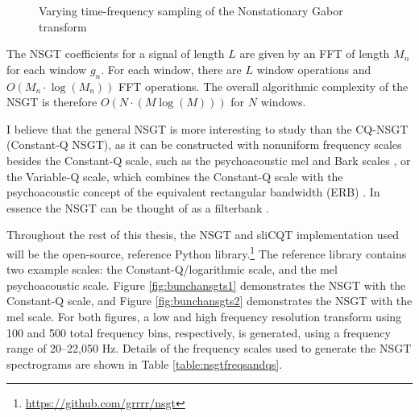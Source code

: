 \documentclass[report.tex]{subfiles}
\begin{document}
\begin{figure}[ht]
	\centering
	\hspace{1em}
	\caption{Varying time-frequency sampling of the Nonstationary Gabor transform \parencite[1485, 1487]{balazs}}
	\label{fig:nonuniformtflattices}
\end{figure}

The NSGT coefficients for a signal of length $L$ are given by an FFT of length $M_{n}$ for each window $g_{n}$. For each window, there are $L$ window operations and $O(M_{n} \cdot \log(M_{n}))$ FFT operations. The overall algorithmic complexity of the NSGT is therefore $O(N \cdot (M \log(M)))$ for $N$ windows.

I believe that the general NSGT is more interesting to study than the CQ-NSGT (Constant-Q NSGT), as it can be constructed with nonuniform frequency scales besides the Constant-Q scale, such as the psychoacoustic mel and Bark scales \parencite{melbook}, or the Variable-Q scale, which combines the Constant-Q scale with the psychoacoustic concept of the equivalent rectangular bandwidth (ERB) \parencite{variableq1, variableq2}. In essence the NSGT can be thought of as a filterbank \parencite{variableq1}.

Throughout the rest of this thesis, the NSGT and sliCQT implementation used will be the open-source, reference Python library.\footnote{\url{https://github.com/grrrr/nsgt}} The reference library contains two example scales: the Constant-Q/logarithmic scale, and the mel psychoacoustic scale. Figure \ref{fig:bunchansgts1} demonstrates the NSGT with the Constant-Q scale, and Figure \ref{fig:bunchansgts2} demonstrates the NSGT with the mel scale. For both figures, a low and high frequency resolution transform using 100 and 500 total frequency bins, respectively, is generated, using a frequency range of 20--22,050 Hz. Details of the frequency scales used to generate the NSGT spectrograms are shown in Table \ref{table:nsgtfreqsandqs}.
\end{document}
